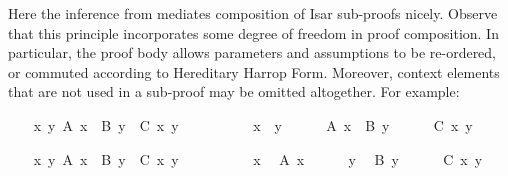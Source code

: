 \begin{isabellebody}
\begin{minipage}[t]{0.35\textwidth}
\end{minipage}
%
\endisatagproof
{\isafoldproof}%
%
\isadelimproof
%
\endisadelimproof
%
\begin{isamarkuptext}%
Here the \hyperlink{inference.refinement}{\mbox{}} inference from
   mediates composition of Isar
  sub-proofs nicely.  Observe that this principle incorporates some
  degree of freedom in proof composition.  In particular, the proof
  body allows parameters and assumptions to be re-ordered, or commuted
  according to Hereditary Harrop Form.  Moreover, context elements
  that are not used in a sub-proof may be omitted altogether.  For
  example:%
\end{isamarkuptext}%
\isamarkuptrue%
%
\begin{minipage}{0.5\textwidth}
%
\isadelimproof
%
\endisadelimproof
%
\isatagproof
\ \ \isamarkupfalse%
\ {\isachardoublequoteopen}{\isasymAnd}x\ y{\isachardot}\ A\ x\ {\isasymLongrightarrow}\ B\ y\ {\isasymLongrightarrow}\ C\ x\ y{\isachardoublequoteclose}\isanewline
\ \ \isamarkupfalse%
\ {\isacharminus}\isanewline
\ \ \ \ \isamarkupfalse%
\ x\ \ y\isanewline
\ \ \ \ \isamarkupfalse%
\ {\isachardoublequoteopen}A\ x{\isachardoublequoteclose}\ \ {\isachardoublequoteopen}B\ y{\isachardoublequoteclose}\isanewline
\ \ \ \ \isamarkupfalse%
\ {\isachardoublequoteopen}C\ x\ y{\isachardoublequoteclose}\ \isamarkupfalse%
\isanewline
\ \ \isamarkupfalse%
%
\end{minipage}\begin{minipage}{0.5\textwidth}
\ \ \isamarkupfalse%
\ {\isachardoublequoteopen}{\isasymAnd}x\ y{\isachardot}\ A\ x\ {\isasymLongrightarrow}\ B\ y\ {\isasymLongrightarrow}\ C\ x\ y{\isachardoublequoteclose}\isanewline
\ \ \isamarkupfalse%
\ {\isacharminus}\isanewline
\ \ \ \ \isamarkupfalse%
\ x\ \isamarkupfalse%
\ {\isachardoublequoteopen}A\ x{\isachardoublequoteclose}\isanewline
\ \ \ \ \isamarkupfalse%
\ y\ \isamarkupfalse%
\ {\isachardoublequoteopen}B\ y{\isachardoublequoteclose}\isanewline
\ \ \ \ \isamarkupfalse%
\ {\isachardoublequoteopen}C\ x\ y{\isachardoublequoteclose}\ \isamarkupfalse%
\isanewline
\ \ \isamarkupfalse%
%
\end{minipage} \\[\medskipamount] \begin{minipage}{0.5\textwidth}

\end{minipage}
\end{isabellebody}
